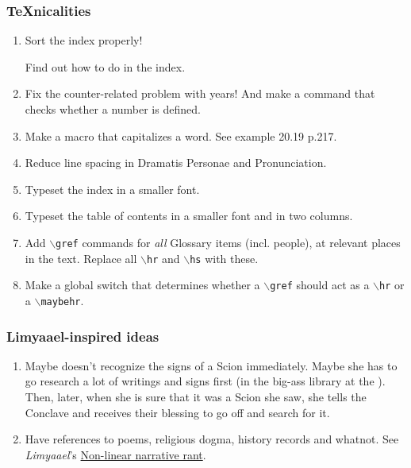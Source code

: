 \subsubsection{\TeX nicalities}
\begin{enumerate}
  \item
    Sort the index properly! 
    
    Find out how to do  in the index. 
  \item   
    Fix the counter-related problem with years! 
    And make a command that checks whether a number is defined.
  \item 
    Make a macro that capitalizes a word. 
    See  example 20.19 p.217. 
  \item 
    Reduce line spacing in Dramatis Personae and Pronunciation. 
  \item 
    Typeset the index in a smaller font.
  \item 
    Typeset the table of contents in a smaller font and in two columns. 
  \item 
    Add \texttt{$\backslash$gref} commands for \emph{all} Glossary items (incl. people), at relevant places in the text. 
    Replace all \texttt{$\backslash$hr} and \texttt{$\backslash$hs} with these. 
  \item 
    Make a global switch that determines whether a \texttt{$\backslash$gref} should act as a \texttt{$\backslash$hr} or a \texttt{$\backslash$maybehr}. 
\end{enumerate}





\subsubsection{Limyaael-inspired ideas}
\begin{enumerate}
  \item
    Maybe \Esmerel{} doesn't recognize the signs of a Scion immediately. 
    Maybe she has to go research a lot of writings and signs first (in the big-ass library at the \TopazChateau). 
    Then, later, when she is sure that it was a Scion she saw, she tells the Conclave and receives their blessing to go off and search for it. 
  
  \item 
    Have references to poems, religious dogma, history records and whatnot. 
    See \emph{Limyaael}'s \href{http://limyaael.livejournal.com/357919.html}{Non-linear narrative rant}.
\end{enumerate}






